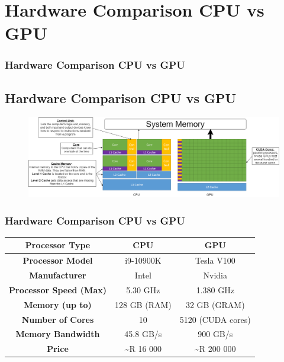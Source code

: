\documentclass[11pt]{beamer}
\begin{document}
\section{Hardware Comparison CPU vs GPU}
\begin{frame}
	\frametitle{Hardware Comparison CPU vs GPU}
	\subsection{Hardware Comparison CPU vs GPU}
	 \begin{figure}
	 	\includegraphics[width=\textwidth,height=\textheight,keepaspectratio]{cpu_vs_gpu}
	 \end{figure}
\end{frame}

\begin{frame}
	\frametitle{Hardware Comparison CPU vs GPU}
\begin{center}
	\begin{tabular}{| c | c | c |}
		\hline
		\textbf{Processor Type} & \textbf{CPU} & \textbf{GPU} \\ 
		\hline
		\textbf{Processor Model} & i9-10900K & Tesla V100 \\  
		\textbf{Manufacturer} & Intel & Nvidia  \\
		\textbf{Processor Speed (Max)} & 5.30 GHz & 1.380 GHz  \\
		\textbf{Memory (up to)} & 128 GB (RAM) & 32 GB (GRAM) \\
		\textbf{Number of Cores} & 10 & 5120 (CUDA cores) \\
		\textbf{Memory Bandwidth} & 45.8 GB/s & 900 GB/s\\
		\textbf{Price} & \textasciitilde R 16 000 & \textasciitilde R 200 000\\
		\hline  
	\end{tabular}
\end{center}
\end{frame}
\end{document}
